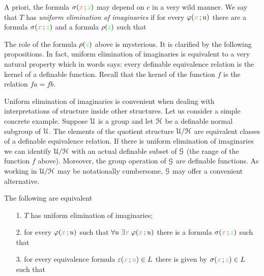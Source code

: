 \documentclass[creche.tex]{subfiles}
\begin{document}

A priori, the formula $\sigma({\color{brown} x}\,;{\color{green} z})$ may depend on $c$ in a very wild manner.
We say that $T$ has \emph{uniform elimination of imaginaries\/} if for every $\varphi({\color{brown} x}\,;u)$ there are a formula $\sigma({\color{brown} x}\,;{\color{green} z})$ and a formula $\rho({\color{green} z})$ such that 


The role of the formula $\rho({\color{green} z})$ above is mysterious.
It is clarified by the following propositions.
In fact, uniform elimination of imaginaries is equivalent to a very natural property which in words says: every definable equivalence relation is the kernel of a definable function.
Recall that the kernel of the function $f$ is the relation $fa=fb$.

Uniform elimination of imaginaries is convenient when dealing with interpretations of structure inside other structures.
Let us consider a simple concrete example.
Suppose $\EuScript U$ is a group and let $\EuScript H$ be a definable normal subgroup of $\EuScript U$.
The elements of the quotient structure $\EuScript U/\EuScript H$ are equivalent classes of a definable equivalence relation.
If there is uniform elimination of imaginaries we can identify $\EuScript U/\EuScript H$ with an actual definable subset of $\EuScript G$ (the range of the function $f$ above).
Moreover, the group operation of $\EuScript G$ are definable functions.
As working in $\EuScript U/\EuScript H$ may be notationally cumbersome, $\EuScript G$ may offer a convenient alternative.

\begin{proposition}\label{prop_uei_standard}
The following are equivalent
\begin{itemize}
\item[1.] $T$ has uniform elimination of imaginaries;
\end{itemize}
\begin{itemize}
\item[2.] for every $\varphi({\color{brown} x}\,;u)$ such that  $\forall u\;\exists{\color{brown}x}\;\varphi({\color{brown} x}\,;u)$ there is a formula $\sigma({\color{brown} x}\,;{\color{green} z})$ such that 
\end{itemize}


\begin{itemize}
\item[3.] for every equivalence formula $\varepsilon({\color{brown} x}\,;{\color{brown} u})\in L$ there is given by $\sigma({\color{brown} x}\,;{\color{green} z})\in L$ such that
\end{itemize}



\end{proposition}
\end{document}

